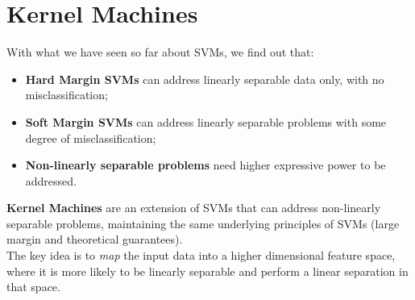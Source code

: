 \section{Kernel Machines}
With what we have seen so far about SVMs, we find out that:
\begin{itemize}
    \item \textbf{Hard Margin SVMs} can address linearly separable data only, with no misclassification;
    \item \textbf{Soft Margin SVMs} can address linearly separable problems with some degree of misclassification;
    \item \textbf{Non-linearly separable problems} need higher expressive power to be addressed.
\end{itemize}
\textbf{Kernel Machines} are an extension of SVMs that can address non-linearly separable problems, 
maintaining the same underlying principles of SVMs (large margin and theoretical guarantees).
\\The key idea is to \textit{map} the input data into a higher dimensional feature space, where it is more likely 
to be linearly separable and perform a linear separation in that space.
